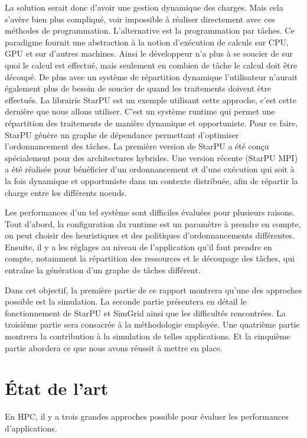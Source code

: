 \documentclass[smallextended]{svjour3}
\begin{document}
La solution serait donc d'avoir une gestion dynamique des
charges. Mais cela s'avère bien plus compliqué, voir impossible
à réaliser directement avec ces méthodes de
programmation. L'alternative est la programmation par tâches. Ce    
paradigme fournit une abstraction à la notion d'exécution de calculs sur CPU,
GPU et sur d'autres machines. Ainsi le développeur n'a plus à se
soucier de sur quoi le calcul est effectué, mais seulement en
combien de tâche le calcul doit être découpé. De plus avec un système de
répartition dynamique l'utilisateur n'aurait également plus de
besoin de soucier de quand les traitements doivent être effectués.
La librairie StarPU\cite{StarPU} est un exemple utilisant cette
approche, c'est cette dernière que nous allons utiliser. C'est un
système runtime qui permet une répartition des traitements de
manière dynamique et opportuniste. Pour ce faire, StarPU génère un
graphe de dépendance permettant d'optimiser l'ordonnancement des tâches. 
La première version de StarPU a été conçu spécialement pour des
architectures hybrides. Une version récente (StarPU MPI)\cite{StarPU-MPI} a été
réalisée pour bénéficier d'un ordonnancement et d'une exécution qui
soit à la fois dynamique et opportuniste dans un contexte distribuée,
afin de répartir la charge entre les différents noeuds.

Les performances d'un tel système sont difficiles évaluées pour
plusieurs raisons. Tout d'abord, la configuration du runtime
est un paramètre à prendre en compte, on peut choisir des
heuristiques et des politiques d'ordonnancements différentes.
Ensuite, il y a les réglages au niveau de l'application qu'il faut
prendre en compte, notamment la répartition des ressources et le
découpage des tâches, qui entraîne la génération d'un graphe de
tâches différent.

Dans cet objectif, la première partie de ce rapport montrera qu'une
des approches possible est la simulation. La seconde partie
présentera en détail le fonctionnement de StarPU et SimGrid 
ainsi que les difficultés rencontrées. La troisième partie sera
consacrée à la méthodologie employée.  Une quatrième partie montrera la
contribution à la simulation de telles applications.  Et la
cinquième partie abordera ce que nous avons réussit à mettre en place. 

\section{État de l'art}
\label{sec-2}
En HPC, il y a trois grandes approches possible pour évaluer les
performances d'applications.
\end{document}
